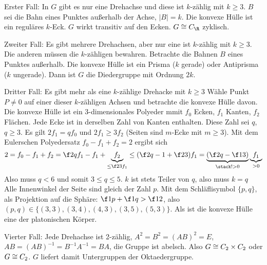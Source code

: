 Erster Fall:
In $G$ gibt es nur eine Drehachse und diese ist $k$-zählig mit $k \ge 3$.
$B$ sei die Bahn eines Punktes außerhalb der Achse, $|B| = k$.
Die konvexe Hülle ist ein reguläres $k$-Eck.
$G$ wirkt transitiv auf den Ecken.
$G \isomorphic C_\R$ zyklisch.

Zweiter Fall:
Es gibt mehrere Drehachsen, aber nur eine ist $k$-zählig mit $k \ge 3$.
Die anderen müssen die $k$-zähligen bewahren.
Betrachte die Bahnen $B$ eines Punktes außerhalb.
Die konvexe Hülle ist ein Prisma ($k$ gerade) oder Antiprisma ($k$ ungerade).
Dann ist $G$ die Diedergruppe mit Ordnung $2k$.

Dritter Fall:
Es gibt mehr als eine $k$-zählige Drehacke mit $k \ge 3$
Wähle Punkt $P \neq 0$ auf einer dieser $k$-zähligen Achsen und betrachte die konvexe Hülle davon.
Die konvexe Hülle ist ein 3-dimensionales Polyeder mmit $f_0$ Ecken, $f_1$ Kanten, $f_2$ Flächen.
Jede Ecke ist in derselben Zahl von Kanten enthalten.
Diese Zahl sei $q$, $q \ge 3$.
Es gilt $2 f_1 = q f_0$ und $2f_1 \ge 3 f_2$ (Seiten sind $m$-Ecke mit $m \ge 3$).
Mit dem Eulerschen Polyedersatz $f_0 - f_1 + f_2 = 2$ ergibt sich
\[
	2 = f_0 - f_1 + f_2
	= \f 2q f_1 - f_1 + \underbrace{f_2}_{\le \f 23 f_1}
	\le (\f 2q - 1 + \f 23) f_1
	= \underbrace{(\f 2q - \f 13)}_{\stack !> 0} \underbrace{f_1}_{> 0}
\]
Also muss $q < 6$ und somit $3 \le q \le 5$.
$k$ ist stets Teiler von $q$, also muss $k = q$
Alle Innenwinkel der Seite sind gleich der Zahl $p$.
Mit dem Schläflisymbol $\{p, q\}$, als Projektion auf die Sphäre: $\f 1p + \f 1q > \f 12$, also $(p,q) \in \{ (3,3), (3,4), (4, 3), (3,5), (5,3) \}$.
Als ist die konvexe Hülle eine der platonischen Körper.

Vierter Fall:
Jede Drehachse ist 2-zählig, $A^2 = B^2 = (AB)^2 = E$, $AB = (AB)^{-1} = B^{-1} A^{-1} = BA$, die Gruppe ist abelsch.
Also $G \cong C_2 \times C_2$ oder $G \cong C_2$.
$G$ liefert damit Untergruppen der Oktaedergruppe.


